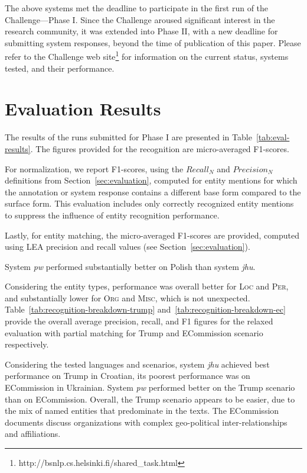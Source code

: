 \documentclass[11pt]{article}
\begin{document}
The above systems met the deadline to participate in the first run of the
Challenge---Phase I.
%
Since the Challenge aroused significant interest in the research
community, it was extended into Phase II, with a new deadline for
submitting system responses, beyond the time of publication of this
paper.  Please refer to the Challenge web
site\footnote{http://bsnlp.cs.helsinki.fi/shared\_task.html} for
information on the current status, systems tested, and their performance.

\section{Evaluation Results}
\label{sec:results}

The results of the runs submitted for Phase I are presented in
Table~\ref{tab:eval-results}.  The figures provided for the recognition
are micro-averaged F1-scores.

For normalization, we report F1-scores, using the $\mathit{Recall}_{N}$ and
$\mathit{Precision}_{N}$ definitions from Section~\ref{sec:evaluation}, computed
for entity mentions for which the annotation or system response contains
a different base form compared to the surface form.  This evaluation
includes only correctly recognized entity mentions to suppress the
influence of entity recognition performance.

Lastly, for entity matching, the micro-averaged F1-scores are provided,
computed using LEA precision and recall values (see
Section~\ref{sec:evaluation}).

System {\em pw} performed substantially better on Polish than system {\em
  jhu}.

Considering the entity types, performance was overall better for \textsc{Loc} and
\textsc{Per}, and substantially lower for \textsc{Org} and \textsc{Misc}, which is not unexpected. 
Table~\ref{tab:recognition-breakdown-trump} and~\ref{tab:recognition-breakdown-ec}
provide the overall average precision, recall, and F1 figures for the relaxed evaluation
with partial matching for {\sc Trump} and {\sc ECommission} scenario respectively.

Considering the tested languages and scenarios, system {\em jhu} achieved
best performance on {\sc Trump} in Croatian, its poorest performance was
on {\sc ECommission} in Ukrainian.  System {\em pw} performed better on
the {\sc Trump} scenario than on {\sc ECommission}.  Overall, the {\sc
  Trump} scenario appears to be easier, due to the mix of named entities
that predominate in the texts.  The {\sc ECommission} documents discuss
organizations with complex geo-political inter-relationships and
affiliations.
\end{document}
